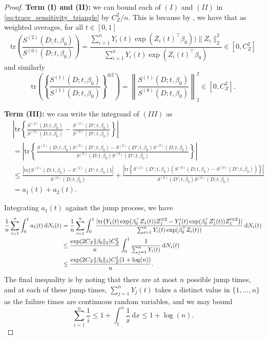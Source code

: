 \documentclass[10pt,a4paper]{amsart}
\newcommand{\dint}{\,\mathrm{d}}
\begin{document}
\begin{proof}
\medskip
\noindent \textbf{Term (I) and (II):} we can bound each of $(I)$ and $(II)$ in \eqref{eq:trace_sensitivity_triangle} by $C_Z^2/n$. This is because by , we have that as weighted averages, for all $t \in [0, 1]$
\begin{equation}
    \mathrm{tr} \left(\frac{S^{(2)}(D; t, \beta_0)}{S^{(0)}(D; t, \beta_0)} \right) =  \frac{\sum_{i=1}^n Y_i(t) \exp(Z_i(t)^\top \beta_0)) \|Z_i\|_2^2}{\sum_{i=1}^n Y_i(t) \exp(Z_i(t)^\top \beta_0)}   \in [0, C_Z^2]
    \label{eq:deg2_bound}
\end{equation}
and similarly 
\begin{equation}
     \mathrm{tr} \left( \left\{\frac{S^{(1)}(D; t, \beta_0)}{S^{(1)}(D; t, \beta_0)} \right\}^{\otimes 2} \right) = 
     \left\|\frac{S^{(1)}(D; t, \beta_0)}{S^{(0)}(D; t, \beta_0)}\right\|_2^2 \in [0, C_Z^2].
     \label{eq:deg1_bound}
\end{equation}

\medskip
\noindent \textbf{Term (III):} we can write the integrand of $(III)$ as 
\begin{align*}
    & \left|\mathrm{tr} \left\{\frac{S^{(2)}(D; t, \beta_0)}{S^{(0)}(D; t, \beta_0)} - \frac{S^{(2)}(D'; t, \beta_0)}{S^{(0)}(D'; t, \beta_0)} \right\} \right| \\
    & = \left|\mathrm{tr} \left\{\frac{S^{(2)}(D; t, \beta_0)S^{(0)}(D'; t, \beta_0) - S^{(2)}(D'; t, \beta_0) S^{(0)}(D; t, \beta_0)}{S^{(0)}(D; t, \beta_0)S^{(0)}(D'; t, \beta_0)} \right\} \right| \\
    &\leq \frac{ |\mathrm{tr} \{S^{(2)}(D; t, \beta_0) - S^{(2)}(D'; t, \beta_0)\}|}{S^{(0)}(D; t, \beta_0)} + \frac{ \left|\mathrm{tr} \left\{S^{(2)}(D'; t, \beta_0) \left(S^{(0)}(D; t, \beta_0) - S^{(0)}(D'; t, \beta_0)\right) \right\} \right|}{S^{(0)}(D'; t, \beta_0) S^{(0)}(D;t, \beta_0)} \\
    &=a_1(t) + a_2(t).
\end{align*}

Integrating $a_1(t)$ against the jump process, we have 
\begin{align}
    \frac{1}{n} \sum_{i=1
    }^n \int_0^1 a_1(t) \dint N_i(t) &= \frac{1}{n} \sum_{i=1
    }^n \int_0^1 \frac{ |\mathrm{tr} \{Y_1(t) \exp(\beta_0^\top Z_1(t))Z_1^{\otimes 2} - Y_1'(t) \exp(\beta_0^\top Z_1'(t)) Z_1'^{\otimes 2}\}|}{\sum_{i=1}^n Y_i(t) \exp(\beta_0^\top Z_i(t))} \dint N_i(t) \notag \\
    &\leq \frac{\exp(2C_Z \|\beta_0\|_2)C_Z^2}{n} \int_0^1 \frac{1}{\sum_{j=1}^n Y_i(t)} \dint N_i(t) \notag \\
    &\leq \frac{\exp(2C_Z\|\beta_0\|_2)C_Z^2(1 + \log (n))}{n}.
    \label{eq:sens_log_example}
\end{align}
The final inequality is by noting that there are at most $n$ possible jump times, and at each of these jump times, $\sum_{j=1}^n Y_j(t)$ takes a distinct value in $\{1, \dots, n\}$ as the failure times are continuous random variables, and we may bound 
\begin{equation*}
    \sum_{i=1}^n \frac{1}{i} \leq 1 + \int_1^{n} \frac{1}{x} \dint x \leq 1 + \log(n).
\end{equation*}


\end{proof}
\end{document}
